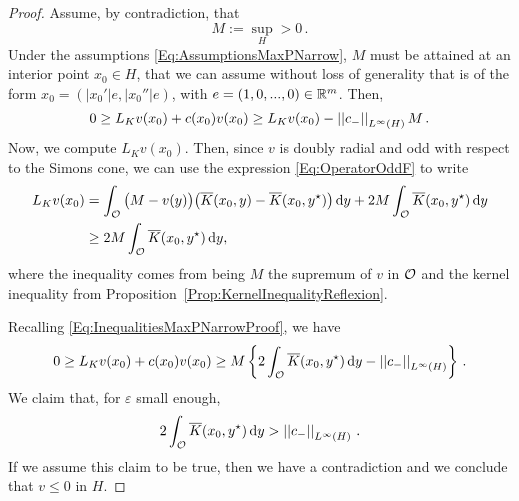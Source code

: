 \begin{proof}
	Assume, by contradiction, that
	$$
	M := \sup_H > 0\,.
	$$
	Under the assumptions \eqref{Eq:AssumptionsMaxPNarrow}, $M$ must be attained at an interior point $x_0 \in H$, that we can assume without loss of generality that is of the form $x_0 = (|x_0'|e,|x_0''|e)$, with $e=(1,0,...,0)\in\mathbb{R}^m$. Then,
	\begin{equation}
	\label{Eq:InequalitiesMaxPNarrowProof}
	0 \geq L_K  v(x_0) + c(x_0)v(x_0) \geq L_K  v(x_0) - \left | \left |{c_-} \right | \right |_{L^\infty(H)}M\,.
	\end{equation} 
	Now, we compute $L_K  v(x_0)$. Then, since $v$ is doubly radial and odd with respect to the Simons cone, we can use the expression \eqref{Eq:OperatorOddF} to write
	\begin{align*}
	L_K v(x_0) &= \int_{\mathcal{O}} \big (M - v(y) \big) \big (\overline{K}(x_0,y) -\overline{K}(x_0,y^\star)\big) \,\mathrm{d} y + 2M\int_{\mathcal{O}} \overline{K}(x_0,y^\star)\,\mathrm{d} y\\
    &\geq2M \int_{\mathcal{O}} \overline{K}(x_0,y^\star)\,\mathrm{d} y,
	\end{align*}
    where the inequality comes from being $M$ the supremum of $v$ in $\mathcal{O}$ and the kernel inequality from Proposition~\ref{Prop:KernelInequalityReflexion}.   
    
	Recalling \eqref{Eq:InequalitiesMaxPNarrowProof}, we have
	$$
	0 \geq L_K  v(x_0) + c(x_0)v(x_0)  \geq M \left\{ 2 \int_{\mathcal{O}} \overline{K}(x_0,y^\star)\,\mathrm{d} y - \left | \left |{c_-} \right | \right |_{L^\infty(H)}
	\right\}\,.
	$$
	We claim that, for $\varepsilon$ small enough,
	\begin{equation}
	\label{Eq:ClaimMaxPNarrowProof}
	 2 \int_{\mathcal{O}} \overline{K}(x_0,y^\star)\,\mathrm{d} y > \left | \left |{c_-} \right | \right |_{L^\infty(H)}\,.
	\end{equation}
	If we assume this claim to be true, then we have a contradiction and we conclude that $v \leq 0$ in $H$.
	

\end{proof}
